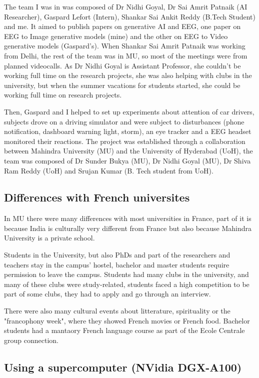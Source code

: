 The team I was in was composed of Dr Nidhi Goyal, Dr Sai Amrit Patnaik (AI
Researcher), Gaspard Lefort (Intern), Shankar Sai Ankit Reddy (B.Tech Student)
and me. It aimed to publish papers on generative AI and EEG, one paper on EEG to
Image generative models (mine) and the other on EEG to Video generative models
(Gaspard's). When Shankar Sai Amrit Patnaik was working from Delhi, the rest of
the team was in MU, so most of the meetings were from planned videocalls.  As Dr
Nidhi Goyal is Assistant Professor, she couldn't be working full time on the
research projects, she was also helping with clubs in the university, but when
the summer vacations for students started, she could be working full time on
research projects.

Then, Gaspard and I helped to set up experiments about attention of car drivers,
subjects drove on a driving simulator and were subject to disturbances (phone
notification, dashboard warning light, storm), an eye tracker and a EEG headset
monitored their reactions. The project was established through a collaboration
between Mahindra University (MU) and the University of Hyderabad (UoH), the team
was composed of Dr Sunder Bukya (MU), Dr Nidhi Goyal (MU), Dr Shiva Ram Reddy
(UoH) and Srujan Kumar (B. Tech student from UoH).

\subsection{Differences with French universites}

In MU there were many differences with most universities in France, part of it
is because India is culturally very different from France but also because
Mahindra University is a private school.

Students in the University, but also PhDs and part of the researchers and
teachers stay in the campus' hostel, bachelor and master students require
permission to leave the campus. Students had many clubs in the university, and
many of these clubs were study-related, students faced a high competition to be
part of some clubs, they had to apply and go through an interview.

There were also many cultural events about litterature, spirituality or the
"francophony week", where they showed French movies or French food.  Bachelor
students had a mantaory French language course as part of the Ecole Centrale
group connection. 

\subsection{Using a supercomputer (NVidia DGX-A100)}


